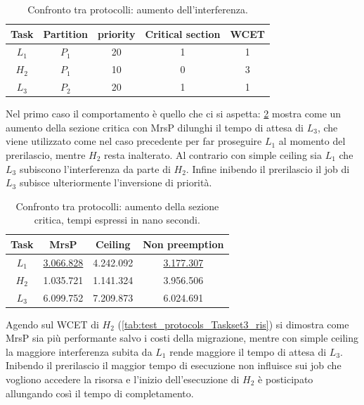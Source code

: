   \begin{table}
  \centering
  \begin{tabular}{ccccc}
  \hline\hline
    Task & Partition     & priority & Critical section & WCET  \\ \hline
    $L_1$ & $P_1$  & 20 & 1 & 1 \\
    $H_2$ & $P_1$  & 10 & 0 & 3 \\
    $L_3$ & $P_2$  & 20 & 1 & 1 \\
    \hline
    \end{tabular}
    \caption{Confronto tra protocolli: aumento dell'interferenza.}
  \label{tab:test_protocols_Taskset3}
  \end{table}

\noindent Nel primo caso il comportamento è quello che ci si aspetta: \ref{tab:test_protocols_Taskset2_ris} mostra come un aumento della sezione critica con MrsP dilunghi il tempo di attesa di $L_3$, che viene utilizzato come nel caso precedente per far proseguire $L_1$ al momento del prerilascio, mentre $H_2$ resta inalterato. Al contrario con simple ceiling sia $L_1$ che $L_3$ subiscono l'interferenza da parte di $H_2$. Infine inibendo il prerilascio il job di $L_3$ subisce ulteriormente l'inversione di priorità.\\

\begin{table}
  \centering
  \begin{tabular}{cccc}
  \hline\hline
    Task & MrsP & Ceiling & Non preemption \\ \hline
    $L_1$ & \underline{3.066.828} & 4.242.092 & \underline{3.177.307} \\
    $H_2$ & 1.035.721 & 1.141.324 & 3.956.506 \\
    $L_3$ & 6.099.752 & 7.209.873 & 6.024.691 \\
    \hline
    \end{tabular}
    \caption{Confronto tra protocolli: aumento della sezione critica, tempi espressi in nano secondi.}
  \label{tab:test_protocols_Taskset2_ris}
  \end{table}

\noindent Agendo sul WCET di $H_2$ (\ref{tab:test_protocols_Taskset3_ris}) si dimostra come MrsP sia più performante salvo i costi della migrazione, mentre con simple ceiling la maggiore interferenza subita da $L_1$ rende maggiore il tempo di attesa di $L_3$. Inibendo il prerilascio il maggior tempo di esecuzione non influisce sui job che vogliono accedere la risorsa e l'inizio dell'esecuzione di $H_2$ è posticipato allungando così il tempo di completamento.\\

